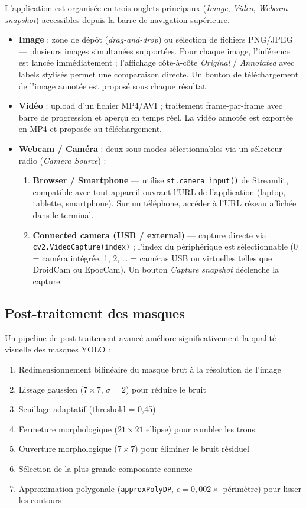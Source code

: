 \documentclass[12pt, a4paper]{report}
\begin{document}
L'application est organisée en trois onglets principaux (\textit{Image}, \textit{Video}, \textit{Webcam snapshot}) accessibles depuis la barre de navigation supérieure.

\begin{itemize}
  \item \textbf{Image} : zone de dépôt (\textit{drag-and-drop}) ou sélection de fichiers PNG/JPEG — plusieurs images simultanées supportées. Pour chaque image, l'inférence est lancée immédiatement ; l'affichage côte-à-côte \textit{Original} / \textit{Annotated} avec labels stylisés permet une comparaison directe. Un bouton de téléchargement de l'image annotée est proposé sous chaque résultat.

  \item \textbf{Vidéo} : upload d'un fichier MP4/AVI ; traitement frame-par-frame avec barre de progression et aperçu en temps réel. La vidéo annotée est exportée en MP4 et proposée au téléchargement.

  \item \textbf{Webcam / Caméra} : deux sous-modes sélectionnables via un sélecteur radio (\textit{Camera Source}) :
  \begin{enumerate}
    \item \textbf{Browser / Smartphone} — utilise \texttt{st.camera\_input()} de Streamlit, compatible avec tout appareil ouvrant l'URL de l'application (laptop, tablette, smartphone). Sur un téléphone, accéder à l'URL réseau affichée dans le terminal.
    \item \textbf{Connected camera (USB / external)} — capture directe via \texttt{cv2.VideoCapture(index)} ; l'index du périphérique est sélectionnable (0 = caméra intégrée, 1, 2, … = caméras USB ou virtuelles telles que DroidCam ou EpocCam). Un bouton \textit{Capture snapshot} déclenche la capture.
  \end{enumerate}
\end{itemize}

\subsection{Post-traitement des masques}

Un pipeline de post-traitement avancé améliore significativement la qualité visuelle des masques YOLO :

\begin{enumerate}
  \item Redimensionnement bilinéaire du masque brut à la résolution de l'image
  \item Lissage gaussien ($7\times7$, $\sigma=2$) pour réduire le bruit
  \item Seuillage adaptatif (threshold = 0,45)
  \item Fermeture morphologique ($21\times21$ ellipse) pour combler les trous
  \item Ouverture morphologique ($7\times7$) pour éliminer le bruit résiduel
  \item Sélection de la plus grande composante connexe
  \item Approximation polygonale (\texttt{approxPolyDP}, $\epsilon = 0,002 \times$ périmètre) pour lisser les contours
\end{enumerate}
\end{document}
